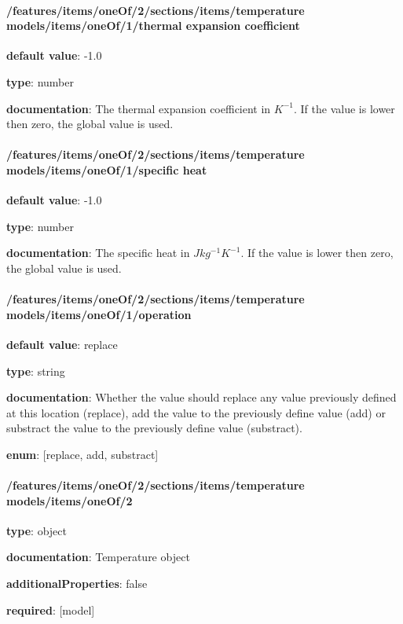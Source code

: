 \begin{itemized}
\end{itemized}\paragraph{/features/items/oneOf/2/sections/items/temperature models/items/oneOf/1/thermal expansion coefficient} \begin{itemized}
\item {\bf default value}: -1.0
\item {\bf type}: number
\item {\bf documentation}: The thermal expansion coefficient in $K^{-1}$. If the value is lower then zero, the global value is used.
\end{itemized}\paragraph{/features/items/oneOf/2/sections/items/temperature models/items/oneOf/1/specific heat} \begin{itemized}
\item {\bf default value}: -1.0
\item {\bf type}: number
\item {\bf documentation}: The specific heat in $J kg^{-1} K^{-1}$. If the value is lower then zero, the global value is used.
\end{itemized}\paragraph{/features/items/oneOf/2/sections/items/temperature models/items/oneOf/1/operation} \begin{itemized}
\item {\bf default value}: replace
\item {\bf type}: string
\item {\bf documentation}: Whether the value should replace any value previously defined at this location (replace), add the value to the previously define value (add) or substract the value to the previously define value (substract).
\item {\bf enum}: [replace, add, substract]\end{itemized}\paragraph{/features/items/oneOf/2/sections/items/temperature models/items/oneOf/2} \begin{itemized}
\item {\bf type}: object
\item {\bf documentation}: Temperature object
\item {\bf additionalProperties}: false
\item {\bf required}: [model]\end{itemized}

